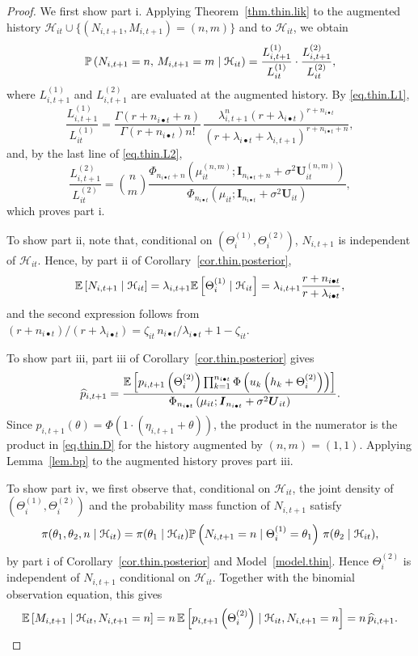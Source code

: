 \begin{proof}
We first show part i. Applying Theorem~\ref{thm.thin.lik} to the
augmented history
\(\mathcal H_{it}\cup\{(N_{i,t+1},M_{i,t+1})=(n,m)\}\) and to
\(\mathcal H_{it}\), we obtain
\[
\P{N_{i,t+1}=n,\,M_{i,t+1}=m\mid\mathcal H_{it}}
=
\frac{L^{(1)}_{i,t+1}}{L^{(1)}_{it}}
\cdot
\frac{L^{(2)}_{i,t+1}}{L^{(2)}_{it}},
\]
where \(L^{(1)}_{i,t+1}\) and \(L^{(2)}_{i,t+1}\) are evaluated at the
augmented history. By \eqref{eq.thin.L1},
\[
\frac{L^{(1)}_{i,t+1}}{L^{(1)}_{it}}
=
\frac{\Gamma\left(r+n_{i\bullet t}+n\right)}
{\Gamma\left(r+n_{i\bullet t}\right)n!}
\,
\frac{\lambda_{i,t+1}^{n}\left(r+\lambda_{i\bullet t}\right)^{r+n_{i\bullet t}}}
{\left(r+\lambda_{i\bullet t}+\lambda_{i,t+1}\right)^{r+n_{i\bullet t}+n}},
\]
and, by the last line of \eqref{eq.thin.L2},
\[
\frac{L^{(2)}_{i,t+1}}{L^{(2)}_{it}}
=
\binom{n}{m}
\frac{
\Phi_{n_{i\bullet t}+n}
\left(
\mu_{it}^{(n,m)};
\boldsymbol I_{n_{i\bullet t}+n}+\sigma^2\boldsymbol U_{it}^{(n,m)}
\right)
}{
\Phi_{n_{i\bullet t}}
\left(
\mu_{it};
\boldsymbol I_{n_{i\bullet t}}+\sigma^2\boldsymbol U_{it}
\right)
},
\]
which proves part i.

To show part ii, note that, conditional on
\(\left(\Theta_i^{(1)},\Theta_i^{(2)}\right)\), \(N_{i,t+1}\) is
independent of \(\mathcal H_{it}\). Hence, by part ii of
Corollary~\ref{cor.thin.posterior},
\[
\E{N_{i,t+1}\mid\mathcal H_{it}}
=
\lambda_{i,t+1}\E{\Theta_i^{(1)}\mid\mathcal H_{it}}
=
\lambda_{i,t+1}\frac{r+n_{i\bullet t}}{r+\lambda_{i\bullet t}},
\]
and the second expression follows from
\(
(r+n_{i\bullet t})/(r+\lambda_{i\bullet t})
=
\zeta_{it}\,n_{i\bullet t}/\lambda_{i\bullet t}+1-\zeta_{it}.
\)

To show part iii, part iii of Corollary~\ref{cor.thin.posterior} gives
\[
\widehat p_{i,t+1}
=
\frac{
\E{
p_{i,t+1}\left(\Theta_i^{(2)}\right)
\prod_{k=1}^{n_{i\bullet t}}
\Phi\left(u_k\left(h_k+\Theta_i^{(2)}\right)\right)
}
}{
\Phi_{n_{i\bullet t}}
\left(
\mu_{it};
\boldsymbol I_{n_{i\bullet t}}+\sigma^2\boldsymbol U_{it}
\right)
}.
\]
Since
\(p_{i,t+1}(\theta)=\Phi\left(1\cdot(\eta_{i,t+1}+\theta)\right)\), the
product in the numerator is the product in \eqref{eq.thin.D} for the
history augmented by \((n,m)=(1,1)\). Applying Lemma~\ref{lem.bp} to the
augmented history proves part iii.

To show part iv, we first observe that, conditional on
\(\mathcal H_{it}\), the joint density of
\(\left(\Theta_i^{(1)},\Theta_i^{(2)}\right)\) and the probability mass
function of \(N_{i,t+1}\) satisfy
\[
\pi(\theta_1,\theta_2,n\mid\mathcal H_{it})
=
\pi(\theta_1\mid\mathcal H_{it})
\P{N_{i,t+1}=n\mid\Theta_i^{(1)}=\theta_1}
\,
\pi(\theta_2\mid\mathcal H_{it}),
\]
by part i of Corollary~\ref{cor.thin.posterior} and
Model~\ref{model.thin}. Hence \(\Theta_i^{(2)}\) is independent of
\(N_{i,t+1}\) conditional on \(\mathcal H_{it}\). Together with the
binomial observation equation, this gives
\[
\E{M_{i,t+1}\mid\mathcal H_{it},N_{i,t+1}=n}
=
n\,\E{p_{i,t+1}\left(\Theta_i^{(2)}\right)\mid\mathcal H_{it},N_{i,t+1}=n}
=
n\,\widehat p_{i,t+1}.
\]


\end{proof}
